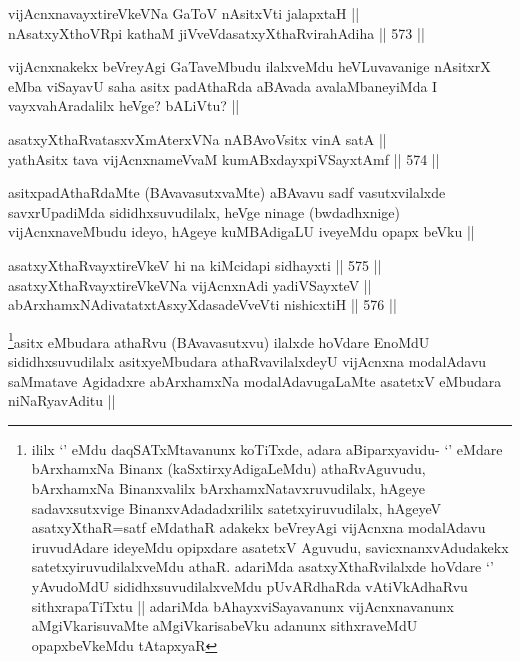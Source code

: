 \begin{shl}
vijAcnxnavayxtireVkeVNa GaToV nAsitxVti jalapxtaH || \\
nAsatxyXthoVR\s pi kathaM jiVveVdasatxyXthaRvirahAdiha ||  573 ||  
\end{shl}

\begin{artha}
vijAcnxnakekx beVreyAgi GaTaveMbudu ilalxveMdu heVLuvavanige nAsitxrX eMba viSayavU saha asitx padAthaRda aBAvada avalaMbaneyiMda I vayxvahAradalilx heVge? bALiVtu? ||
\end{artha}

\begin{shl}
asatxyXthaRvatasxvXmAterxVNa nABAvoV\s sitx vinA satA || \\
yathA\s sitx tava vijAcnxnameVvaM kumABxdayxpiVSayxtAmf ||  574 ||  
\end{shl}

\begin{artha}
asitxpadAthaRdaMte (BAvavasutxvaMte) aBAvavu sadf vasutxvilalxde savxrUpadiMda sididhxsuvudilalx, heVge ninage (bwdadhxnige) vijAcnxnaveMbudu ideyo, hAgeye kuMBAdigaLU iveyeMdu opapx beVku ||
\end{artha}

\begin{shl}
asatxyXthaRvayxtireVkeV hi na kiMcidapi sidhayxti ||  575 ||  \\
asatxyXthaRvayxtireVkeVNa vijAcnxnAdi yadiVSayxteV || \\
abArxhamxNAdivatatxtAsxyXdasadeVveVti nishicxtiH ||  576 ||  
\end{shl}

\begin{artha}
\footnote{ililx `\stext' eMdu daqSATxMtavanunx koTiTxde, adara aBiparxyavidu- `\stext' eMdare bArxhamxNa Binanx (kaSxtirxyAdigaLeMdu) athaRvAguvudu, bArxhamxNa Binanxvalilx bArxhamxNatavxruvudilalx, hAgeye sadavxsutxvige BinanxvAdadadxrililx satetxyiruvudilalx, hAgeyeV asatxyXthaR=satf eMdathaR adakekx beVreyAgi vijAcnxna modalAdavu iruvudAdare ideyeMdu opipxdare asatetxV Aguvudu, savicxnanxvAdudakekx satetxyiruvudilalxveMdu athaR. adariMda asatxyXthaRvilalxde hoVdare `\stext' yAvudoMdU sididhxsuvudilalxveMdu pUvARdhaRda vAtiVkAdhaRvu sithxrapaTiTxtu || adariMda bAhayxviSayavanunx vijAcnxnavanunx aMgiVkarisuvaMte aMgiVkarisabeVku adanunx sithxraveMdU opapxbeVkeMdu tAtapxyaR}asitx eMbudara athaRvu (BAvavasutxvu) ilalxde hoVdare EnoMdU sididhxsuvudilalx asitxyeMbudara athaRvavilalxdeyU vijAcnxna modalAdavu saMmatave Agidadxre abArxhamxNa modalAdavugaLaMte asatetxV eMbudara niNaRyavAditu ||
\end{artha}

